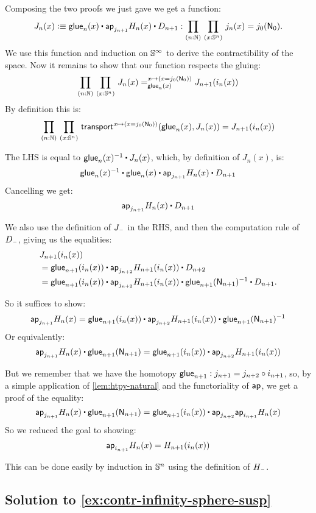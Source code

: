 \documentclass[
%
%
11pt %
]{article}
\begin{document}
Composing the two proofs we just gave we get a function:
\[ J_n(x) \defeq \glue_n(x)\ct \apfunc{j_{n+1}}{H_n(x)}\ct D_{n+1}
    : \prd{n:\nat}{x:\Sn^n} j_n(x) = j_0(\north_0). \]
We use this function and induction on $\mathbb{S}^{\infty}$ to derive
the contractibility of the space.
Now it remains to show that our function respects the gluing:
\[ \prd{n:\nat}{x:\Sn^n} \dpath {x\mapsto (x = j_0(\north_0))}
  {\glue_n(x)} {J_n(x)} {J_{n+1}(i_n (x))} \]
By definition this is:
\[ \prd{n:\nat}{x:\Sn^n}
    \transfib{x\mapsto (x = j_0(\north_0))}{\glue_n(x)}{J_n(x)}
    = {J_{n+1}(i_n (x))} \]

The LHS is equal to $\glue_{n}(x)^{-1}\ct J_n(x)$, which, by definition of
$J_n(x)$, is:
\[ \glue_n(x)^{-1}\ct\glue_n(x)\ct\apfunc{j_{n+1}}{H_n(x)}\ct D_{n+1} \]
Cancelling we get:
\[ \apfunc{j_{n+1}}{H_n(x)}\ct D_{n+1} \]

We also use the definition of $J_{\mathord{\hspace{1pt}\text{--}\hspace{1pt}}}$ in the RHS, and then the computation
rule of $D_{\mathord{\hspace{1pt}\text{--}\hspace{1pt}}}$, giving us the equalities:
\begin{align*}
  & J_{n+1}(i_n(x))\\
  &= \glue_{n+1}(i_n(x))\ct\apfunc{j_{n+2}}{H_{n+1}(i_n(x))}\ct D_{n+2}\\
  &= \glue_{n+1}(i_n(x))\ct\apfunc{j_{n+2}}{H_{n+1}(i_n(x))}\ct
                                  \glue_{n+1}(\north_{n+1})^{-1}\ct D_{n+1}.
\end{align*}

So it suffices to show:
\[ \apfunc{j_{n+1}}{H_n(x)} = \glue_{n+1}(i_n(x))\ct\apfunc{j_{n+2}}{H_{n+1}(i_n(x))}
  \ct\glue_{n+1}(\north_{n+1})^{-1} \]
Or equivalently:
\[ \apfunc{j_{n+1}}{H_n(x)} \ct\glue_{n+1}(\north_{n+1}) =
  \glue_{n+1}(i_n(x))\ct\apfunc{j_{n+2}}{H_{n+1}(i_n(x))} \]

But we remember that we have the homotopy
$\mathsf{glue}_{n+1} : j_{n+1} = j_{n+2}\circ i_{n+1}$, so, by a simple application
of \cref{lem:htpy-natural} and the functoriality of $\mathsf{ap}_{}{}$, we get
a proof of the equality:
\[ \apfunc{j_{n+1}}{H_n(x)} \ct\glue_{n+1}(\north_{n+1}) =
  \glue_{n+1}(i_n(x))\ct\apfunc{j_{n+2}}{\apfunc{i_{n+1}}{H_n(x)}} \]
So we reduced the goal to showing:
\[ \mathsf{ap}_{i_{n+1}}{H_n(x)} = H_{n+1}(i_n(x)) \]

This can be done easily by induction in $\mathbb{S}^n$ using the definition of $H_{\mathord{\hspace{1pt}\text{--}\hspace{1pt}}}$.


\subsection*{Solution to \cref{ex:contr-infinity-sphere-susp}}
\end{document}
